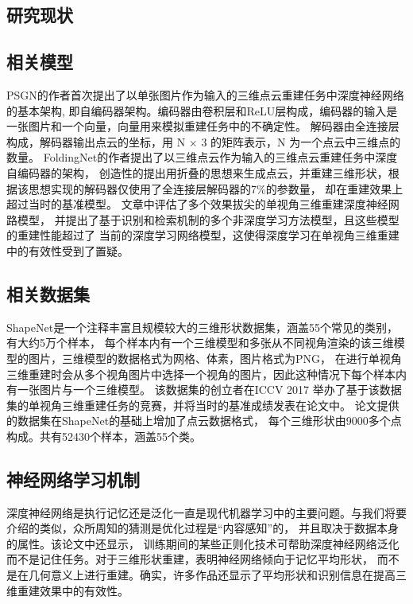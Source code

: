 \documentclass[bachelor, nocolorlinks, printoneside]{seuthesis} %
\begin{document}
\begin{Main}
\section{研究现状}
\subsection{相关模型}
PSGN\cite{fan2017point}的作者首次提出了以单张图片作为输入的三维点云重建任务中深度神经网络的基本架构, 
即自编码器架构。编码器由卷积层和ReLU层构成，编码器的输入是一张图片和一个向量，向量用来模拟重建任务中的不确定性。
解码器由全连接层构成，解码器输出点云的坐标，用 N × 3 的矩阵表示，N 为一个点云中三维点的数量。
FoldingNet\cite{yang2018foldingnet}的作者提出了以三维点云作为输入的三维点云重建任务中深度自编码器的架构，
创造性的提出用折叠的思想来生成点云，并重建三维形状，根据该思想实现的解码器仅使用了全连接层解码器的7\%的参数量，
却在重建效果上超过当时的基准模型。
文章\cite{tatarchenko2019single}中评估了多个效果拔尖的单视角三维重建深度神经网路模型，
并提出了基于识别和检索机制的多个非深度学习方法模型，且这些模型的重建性能超过了
当前的深度学习网络模型，这使得深度学习在单视角三维重建中的有效性受到了置疑。

\subsection{相关数据集}
ShapeNet\cite{chang2015shapenet}是一个注释丰富且规模较大的三维形状数据集，涵盖55个常见的类别，有大约5万个样本，
每个样本内有一个三维模型和多张从不同视角渲染的该三维模型的图片，三维模型的数据格式为网格、体素，图片格式为PNG，
在进行单视角三维重建时会从多个视角图片中选择一个视角的图片，因此这种情况下每个样本内有一张图片与一个三维模型。
该数据集的创立者在ICCV 2017 举办了基于该数据集的单视角三维重建任务的竞赛，并将当时的基准成绩发表在论文\cite{Yi2017LargeScale3S}中。
论文\cite{tatarchenko2019single}提供的数据集在ShapeNet\cite{chang2015shapenet}的基础上增加了点云数据格式，
每个三维形状由9000多个点构成。共有52430个样本，涵盖55个类。

\subsection{神经网络学习机制}
深度神经网络是执行记忆还是泛化一直是现代机器学习中的主要问题。与我们将要介绍的类似，众所周知的猜测是优化过程是“内容感知”的，
并且取决于数据本身的属性\cite{arpit2017closer}。该论文\cite{arpit2017closer}中还显示，
训练期间的某些正则化技术可帮助深度神经网络泛化而不是记住任务。对于三维形状重建，\cite{tatarchenko2019single}表明神经网络倾向于记忆平均形状，
而不是在几何意义上进行重建。确实，许多作品还显示了平均形状和识别信息在提高三维重建效果中的有效性\cite{kanazawa2018learning,pontes2018image2mesh,kurenkov2018deformnet}。


\end{Main}
\end{document}

